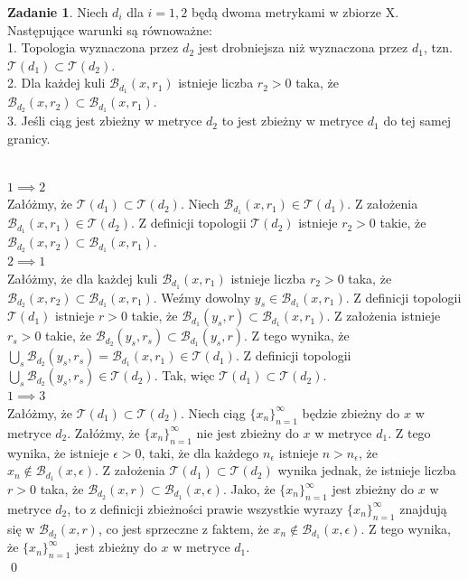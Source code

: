 \documentclass{article}
\theoremstyle{definition}%
\theoremstyle{theorem}
\newtheorem{zad}{Zadanie}
\renewenvironment{proof}{{\bfseries Rozwiązanie}}{\qed}
\begin{document}
	\begin{zad}
		Niech $d_i$ dla $i = 1,2$ będą dwoma metrykami w zbiorze X. Następujące warunki są równoważne:\\
		1. Topologia wyznaczona przez $d_2$ jest drobniejsza niż wyznaczona przez $d_1$, tzn. $\mathcal{T}(d_1)\subset\mathcal{T}(d_2)$.\\
		2. Dla każdej kuli $\mathcal{B}_{d_1}(x,r_1)$ istnieje liczba $r_2>0$ taka, że $\mathcal{B}_{d_2}(x,r_2)\subset\mathcal{B}_{d_1}(x,r_1)$.\\
		3. Jeśli ciąg jest zbieżny w metryce $d_2$ to jest zbieżny w metryce $d_1$ do tej samej granicy.
			\end{zad}
		\begin{proof}
		\\	$1\implies2$\\
		Załóżmy, że $\mathcal{T}(d_1)\subset\mathcal{T}(d_2)$. Niech $\mathcal{B}_{d_1}(x,r_1)\in\mathcal{T}(d_1)$. Z założenia $\mathcal{B}_{d_1}(x,r_1)\in\mathcal{T}(d_2)$. Z definicji topologii $\mathcal{T}(d_2)$ istnieje $r_2>0$ takie, że\\
		$\mathcal{B}_{d_2}(x,r_2)\subset\mathcal{B}_{d_1}(x,r_1)$.\\
		$2\implies1$\\
		Załóżmy, że  dla każdej kuli $\mathcal{B}_{d_1}(x,r_1)$ istnieje liczba $r_2>0$ taka, że\\ $\mathcal{B}_{d_2}(x,r_2)\subset\mathcal{B}_{d_1}(x,r_1)$. Weźmy dowolny $y_s\in\mathcal{B}_{d_1}(x,r_1)$. Z definicji topologii $\mathcal{T}(d_1)$ istnieje $r>0$ takie, że $\mathcal{B}_{d_1}(y_s,r)\subset\mathcal{B}_{d_1}(x,r_1)$. Z założenia istnieje $r_s>0$ takie, że $\mathcal{B}_{d_2}(y_s,r_s)\subset\mathcal{B}_{d_1}(y_s,r)$. Z tego wynika, że $\bigcup_s \mathcal{B}_{d_2}(y_s,r_s) = \mathcal{B}_{d_1}(x,r_1)\in\mathcal{T}(d_1)$. Z definicji topologii $\bigcup_s \mathcal{B}_{d_2}(y_s,r_s)\in\mathcal{T}(d_2)$. Tak, więc $\mathcal{T}(d_1)\subset\mathcal{T}(d_2)$.\\
		$1\implies3$\\
		Załóżmy, że $\mathcal{T}(d_1)\subset\mathcal{T}(d_2)$. Niech ciąg $\{x_n\}_{n=1}^\infty$ będzie zbieżny do $x$ w metryce $d_2$. Załóżmy, że $\{x_n\}_{n=1}^\infty$ nie jest zbieżny do $x$ w metryce $d_1$. Z tego wynika, że istnieje $\epsilon>0$, taki, że dla każdego $n_{\epsilon}$ istnieje $n>n_{\epsilon}$, że $x_n\not\in\mathcal{B}_{d_1}(x,\epsilon)$. Z założenia $\mathcal{T}(d_1)\subset\mathcal{T}(d_2)$ wynika jednak, że istnieje liczba $r>0$ taka, że $\mathcal{B}_{d_2}(x,r)\subset\mathcal{B}_{d_1}(x,\epsilon)$. Jako, że $\{x_n\}_{n=1}^\infty$ jest zbieżny do $x$ w metryce $d_2$, to z definicji zbieżności prawie wszystkie wyrazy $\{x_n\}_{n=1}^\infty$ znajdują się w $\mathcal{B}_{d_2}(x,r)$, co jest sprzeczne z faktem, że $x_n\not\in\mathcal{B}_{d_1}(x,\epsilon)$. Z tego wynika, że $\{x_n\}_{n=1}^\infty$ jest zbieżny do $x$ w metryce $d_1$.\\

\end{proof}
\end{document}
